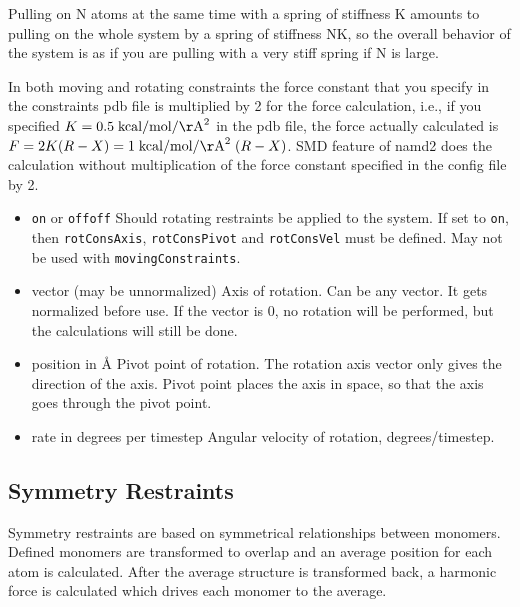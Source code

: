 Pulling on N atoms at the same time with a spring of stiffness K
   amounts to pulling on the whole system by a spring of stiffness NK,
   so the overall behavior of the system is as if you are pulling with a
   very stiff spring if N is large.

In both moving and rotating constraints the force constant that you
   specify in the constraints pdb file is multiplied by 2 for the force
   calculation, i.e., if you specified $K = 0.5 \; {\rm kcal}/{\rm mol}/{\rm \AA}^2$ in the pdb
file,
   the force actually calculated is $F = 2 K (R-X) = 1 \; {\rm kcal}/{\rm mol}/{\rm \AA}^2 \; (R-X)$.
   SMD feature of namd2 does the calculation without multiplication of
the
   force constant specified in the config file by 2.


\begin{itemize}

\item
{}
{{\tt on} or {\tt off}}{{\tt off}}
{Should rotating restraints be applied to the system. If set
to {\tt on}, then {\tt rotConsAxis}, {\tt rotConsPivot} and
{\tt rotConsVel} must be defined.
May not be used with {\tt movingConstraints}.}

\item
{}
{vector (may be unnormalized)}
{Axis of rotation. Can be any vector. It gets
normalized before use. If the vector is 0,
no rotation will be performed, but the calculations
will still be done.}

\item
{}
{position in \AA}
{Pivot point of rotation. The rotation axis vector
only gives the direction of the axis. Pivot point
places the axis in space, so that the axis goes
through the pivot point.}

\item
{}
{rate in degrees per timestep}
{Angular velocity of rotation, degrees/timestep.}

\end{itemize}

\subsection{Symmetry Restraints}
Symmetry restraints are based on symmetrical relationships
between monomers.  Defined monomers are transformed to overlap
and an average position for each atom is calculated.  After the average 
structure is transformed back, a harmonic force is calculated which 
drives each monomer to the average.

